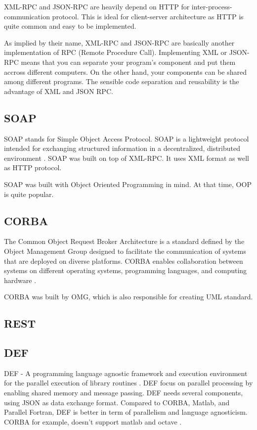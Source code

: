 \documentclass[conference]{IEEEtran}
\begin{document}
XML-RPC and JSON-RPC are heavily depend on HTTP for inter-process-communication 
protocol. This is ideal for client-server architecture as HTTP is quite common and
easy to be implemented.

As implied by their name, XML-RPC and JSON-RPC are basically another implementation
of RPC (Remote Procedure Call). Implementing XML or JSON-RPC means that you can 
separate your program's component and put them accross different computers. On the
other hand, your components can be shared among different programs. The sensible
code separation and reusability is the advantage of XML and JSON RPC.


\subsection{SOAP}

SOAP stands for Simple Object Access Protocol. SOAP is a lightweight protocol 
intended for exchanging structured information in a decentralized, distributed 
environment \cite{soap}. SOAP was built on top of XML-RPC. It uses XML format as 
well as HTTP protocol.

SOAP was built with Object Oriented Programming in mind. At that time, OOP is
quite popular.

\subsection{CORBA}

The Common Object Request Broker Architecture is a standard defined by the Object 
Management Group designed to facilitate the communication of systems that are 
deployed on diverse platforms. CORBA enables collaboration between systems on 
different operating systems, programming languages, and computing hardware 
\cite{corba}. 

CORBA was built by OMG, which is also responsible for creating UML standard.


\subsection{REST}
\blindtext

\subsection{DEF}

DEF - A programming language agnostic framework and execution environment 
for the parallel execution of library routines \cite{feilhauer2016def}. 
DEF focus on parallel processing by enabling shared memory and message passing. 
DEF needs several components, using JSON as data exchange format. 
Compared to CORBA, Matlab, and Parallel Fortran, DEF is better in term of 
parallelism and language agnosticism. CORBA for example, doesn't support matlab and 
octave \cite{feilhauer2016def}. 
\end{document}
